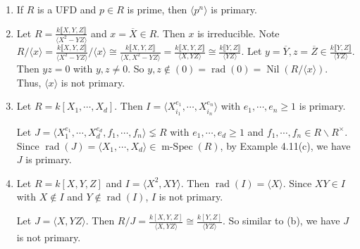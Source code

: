 \begin{example}
    \begin{enumerate}
        \item If $R$ is a UFD and $p \in R$ is prime, then $\langle p^{n} \rangle$ is primary.
        \item Let $R = \frac{k\llbracket X,Y ,Z \rrbracket}{\langle X^{2}-YZ \rangle}$ and $x = \overbar{X} \in R$. Then $x$ is irreducible. Note $R/\langle x \rangle = \frac{k\llbracket X,Y,Z \rrbracket}{\langle X^{2}-YZ \rangle}/\langle x \rangle \cong \frac{k\llbracket X,Y,Z \rrbracket}{\langle X,X^{2}-YZ \rangle} = \frac{k\llbracket X,Y,Z \rrbracket}{\langle X,YZ \rangle} \cong  \frac{k\llbracket Y,Z \rrbracket}{\langle YZ \rangle}$. Let $y = \overbar{Y}, z = \overbar{Z} \in \frac{k\llbracket Y,Z \rrbracket}{\langle YZ \rangle}$. Then $yz = 0$ with $y,z \neq 0$. So $y,z \not \in (0) = \operatorname{rad}(0) = \operatorname{Nil}(R/\langle x \rangle)$. Thus, $\langle x \rangle$ is not primary.
        \item Let $R = k[X_1,\cdots,X_d]$. Then $I = \langle X_{i_1}^{e_1}, \cdots ,X_{i_n}^{e_n} \rangle$ with $e_1,\cdots,e_n \geq 1$ is primary. \par
            Let $J = \langle X_{1}^{e_1},\cdots,X_d^{e_d},f_1,\cdots,f_n \rangle \lneq R$ with $e_1,\cdots,e_d \geq 1$ and $f_1,\cdots,f_n \in R \smallsetminus R^{\times}$. Since $\operatorname{rad}(J) = \langle X_{1},\cdots,X_d \rangle \in \operatorname{m-Spec}(R)$, by Example 4.11(c), we have $J$ is primary.
        \item Let $R = k[X,Y,Z]$ and $I = \langle X^{2},XY\rangle$. Then $\operatorname{rad}(I) = \langle X \rangle$. Since $XY \in I$ with $X \not\in I$ and $Y \not\in \operatorname{rad}(I)$, $I$ is not primary. \par 
            Let $J = \langle X,YZ \rangle$. Then $R/J = \frac{k[X,Y,Z]}{\langle X,YZ \rangle} \cong \frac{k[Y,Z]}{\langle YZ \rangle}$. So similar to (b), we have $J$ is not primary.
    \end{enumerate}
\end{example}

